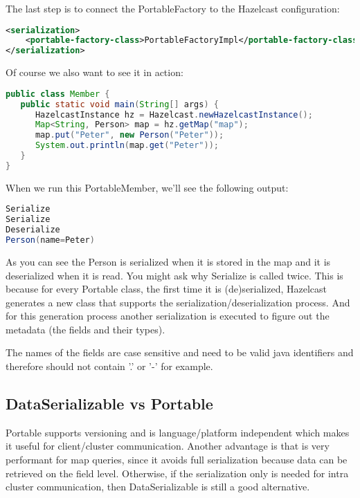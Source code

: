 The last step is to connect the PortableFactory to the Hazelcast configuration:
\begin{lstlisting}[language=xml]
<serialization>
    <portable-factory-class>PortableFactoryImpl</portable-factory-class>
</serialization>
\end{lstlisting}
Of course we also want to see it in action:
\begin{lstlisting}[language=java]
public class Member {
   public static void main(String[] args) {
      HazelcastInstance hz = Hazelcast.newHazelcastInstance();
      Map<String, Person> map = hz.getMap("map");
      map.put("Peter", new Person("Peter"));
      System.out.println(map.get("Peter"));
   }
}
\end{lstlisting}
When we run this PortableMember, we'll see the following output:
\begin{lstlisting}[language=java]
Serialize
Serialize
Deserialize
Person(name=Peter)
\end{lstlisting}
As you can see the Person is serialized when it is stored in the map and it is deserialized when it is read. You might ask why Serialize is called twice. This is because for every Portable class, the first time it is (de)serialized, Hazelcast generates a new class that supports the serialization/deserialization process. And for this generation process another serialization is executed to figure out the metadata (the fields and their types).

The names of the fields are case sensitive and need to be valid java identifiers and therefore should not contain '.' or '-' for example. 

\subsection{DataSerializable vs Portable}
Portable supports versioning and is language/platform independent which makes it useful for client/cluster communication. Another advantage is that is very performant for map queries, since it avoids full serialization because data can be retrieved on the field level. Otherwise, if the serialization only is needed for intra cluster communication, then DataSerializable is still a good alternative.

